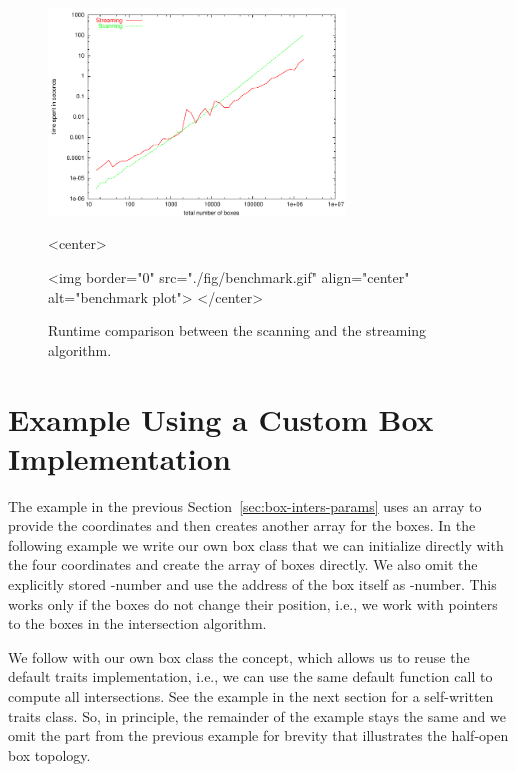 \begin{figure}[htbp]
\begin{ccTexOnly}
\begin{center}
  \includegraphics[width=0.7\textwidth]{Box_intersection_d/fig/benchmark}
\end{center}
\end{ccTexOnly}
\begin{ccHtmlOnly}
<center>
\end{ccHtmlOnly}
  \caption{Runtime comparison between the scanning and the streaming algorithm.
  \label{fig_benchmark}}

\begin{ccHtmlOnly}
<img border="0" src="./fig/benchmark.gif" align="center" alt="benchmark plot">
</center>
\end{ccHtmlOnly}
\end{figure}

\section{Example Using a Custom Box Implementation}

The example in the previous Section~\ref{sec:box-inters-params} uses
an array to provide the coordinates and then creates another array for
the boxes. In the following example we write our own box class
 that we can initialize directly with the four coordinates and
create the array of boxes directly. We also omit the explicitly stored
-number and use the address of the box itself as
-number. This works only if the boxes do not change their
position, i.e., we work with pointers to the boxes in the intersection
algorithm.

We follow with our own box class  the
 concept, which allows us to reuse the
default traits implementation, i.e., we can use the same default
function call to compute all intersections. See the example in the
next section for a self-written traits class. So, in principle, the
remainder of the example stays the same and we omit the part from the
previous example for brevity that illustrates the half-open box topology.

